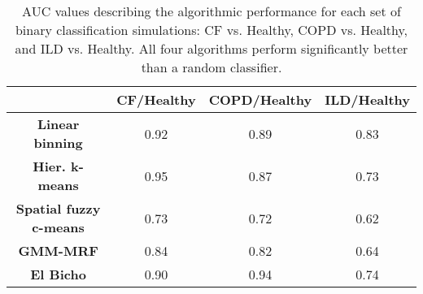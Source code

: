 
\begin{table*}[!htb]
 \centering
 \begin{tabular}{c c c c}
   \toprule
   {} & {\bf CF/Healthy } & {\bf COPD/Healthy} & {\bf ILD/Healthy} \\
   \hline
   {\bf Linear binning} & 0.92  &  0.89  &  0.83  \\
   {\bf Hier. k-means} & 0.95  &  0.87  &  0.73  \\
   {\bf Spatial fuzzy c-means} & 0.73 & 0.72 & 0.62 \\
   {\bf GMM-MRF} &  0.84  &  0.82  &  0.64  \\
   {\bf El Bicho} &  0.90  &  0.94  &  0.74  \\
   \hline
   \bottomrule
   \end{tabular}
 \caption{AUC values describing the algorithmic performance for each set of binary
          classification simulations: CF vs. Healthy, COPD vs. Healthy, and
          ILD vs. Healthy.  All four algorithms perform significantly better than a
          random classifier.
          }
 \label{table:auc}
\end{table*}
